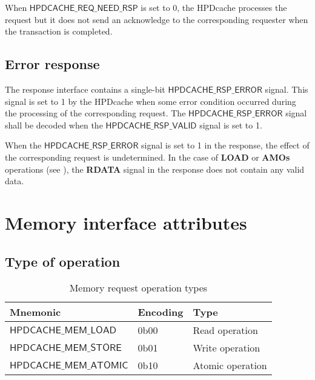 \documentclass[10pt,titlepage,twoside]{book}
\begin{document}
When $\mathsf{HPDCACHE\_REQ\_NEED\_RSP}$ is set to 0, the \ac{HPDcache} processes the request but it does not send an acknowledge to the corresponding requester when the transaction is completed.


\subsection{Error response}%

The response interface contains a single-bit $\mathsf{HPDCACHE\_RSP\_ERROR}$ signal.
This signal is set to 1 by the \ac{HPDcache} when some error condition occurred during the processing of the corresponding request.
The $\mathsf{HPDCACHE\_RSP\_ERROR}$ signal shall be decoded when the $\mathsf{HPDCACHE\_RSP\_VALID}$ signal is set to 1.

When the $\mathsf{HPDCACHE\_RSP\_ERROR}$ signal is set to 1 in the response, the effect of the corresponding request is undetermined.
In the case of \textbf{LOAD} or \textbf{AMOs} operations (see ), the \textbf{RDATA} signal in the response does not contain any valid data.


\clearpage
\section{Memory interface attributes}

\subsection{Type of operation}%

\begin{table}[h!]
\begin{center}
\caption{Memory request operation types}%
{\footnotesize
\begin{tabular}{lll}
  \toprule
  \textbf{Mnemonic}
  & \textbf{Encoding}
  & \textbf{Type} \\
  \midrule
  $\mathsf{HPDCACHE\_MEM\_LOAD}$
  & 0b00
  & Read operation \\
  \midrule
  $\mathsf{HPDCACHE\_MEM\_STORE}$
  & 0b01
  & Write operation \\
  \midrule
  $\mathsf{HPDCACHE\_MEM\_ATOMIC}$
  & 0b10
  & Atomic operation \\
\end{tabular}}
\end{center}
\end{table}
\end{document}
